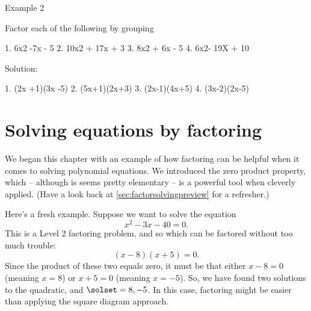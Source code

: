 Example 2

Factor each of the following by grouping

1. 6x2 -7x - 5
2. 10x2 + 17x + 3
3. 8x2 + 6x - 5
4. 6x2- 19X + 10

Solution:

1. (2x +1)(3x -5)
2. (5x+1)(2x+3)
3. (2x-1)(4x+5)
4. (3x-2)(2x-5)

%
%
%
%
%
%
%
%

\section{Solving equations by factoring}

We began this chapter with an example of how factoring can be helpful when it comes to solving polynomial equations. We introduced the zero product property, which -- although is seems pretty elementary -- is a powerful tool when cleverly applied. (Have a look back at \cref{sec:factorsolvingpreview} for a refresher.)

Here's a fresh example. Suppose we want to solve the equation
\[x^2 - 3x - 40 = 0.\]
This is a Level 2 factoring problem, and so which can be factored without too much trouble:
\[(x-8)(x+5) = 0.\]
Since the product of these two equals zero, it must be that either $x-8=0$ (meaning $x=8$) or $x+5=0$ (meaning $x=-5$). So, we have found two solutions to the quadratic, and $\solset={8, -5}$. In this case, factoring might be easier than applying the square diagram approach.

